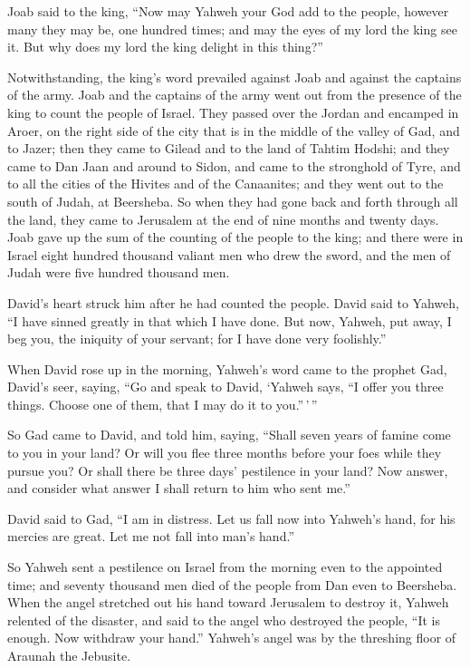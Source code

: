 \begin{paracol}{2}
\begin{otherlanguage}{english}
 Joab said to the king, ``Now may Yahweh your God add to
the people, however many they may be, one hundred times; and may the
eyes of my lord the king see it. But why does my lord the king delight
in this thing?''

 Notwithstanding, the king's word prevailed against Joab
and against the captains of the army. Joab and the captains of the army
went out from the presence of the king to count the people of Israel.
 They passed over the Jordan and encamped in Aroer, on the
right side of the city that is in the middle of the valley of Gad, and
to Jazer;  then they came to Gilead and to the land of
Tahtim Hodshi; and they came to Dan Jaan and around to Sidon,
 and came to the stronghold of Tyre, and to all the cities
of the Hivites and of the Canaanites; and they went out to the south of
Judah, at Beersheba.  So when they had gone back and forth
through all the land, they came to Jerusalem at the end of nine months
and twenty days.  Joab gave up the sum of the counting of
the people to the king; and there were in Israel eight hundred thousand
valiant men who drew the sword, and the men of Judah were five hundred
thousand men.

 David's heart struck him after he had counted the
people. David said to Yahweh, ``I have sinned greatly in that which I
have done. But now, Yahweh, put away, I beg you, the iniquity of your
servant; for I have done very foolishly.''

 When David rose up in the morning, Yahweh's word came to
the prophet Gad, David's seer, saying,  ``Go and speak to
David, `Yahweh says, ``I offer you three things. Choose one of them,
that I may do it to you.''\,'\,''

 So Gad came to David, and told him, saying, ``Shall
seven years of famine come to you in your land? Or will you flee three
months before your foes while they pursue you? Or shall there be three
days' pestilence in your land? Now answer, and consider what answer I
shall return to him who sent me.''

 David said to Gad, ``I am in distress. Let us fall now
into Yahweh's hand, for his mercies are great. Let me not fall into
man's hand.''

 So Yahweh sent a pestilence on Israel from the morning
even to the appointed time; and seventy thousand men died of the people
from Dan even to Beersheba.  When the angel stretched out
his hand toward Jerusalem to destroy it, Yahweh relented of the
disaster, and said to the angel who destroyed the people, ``It is
enough. Now withdraw your hand.'' Yahweh's angel was by the threshing
floor of Araunah the Jebusite.


\end{otherlanguage}
\end{paracol}
